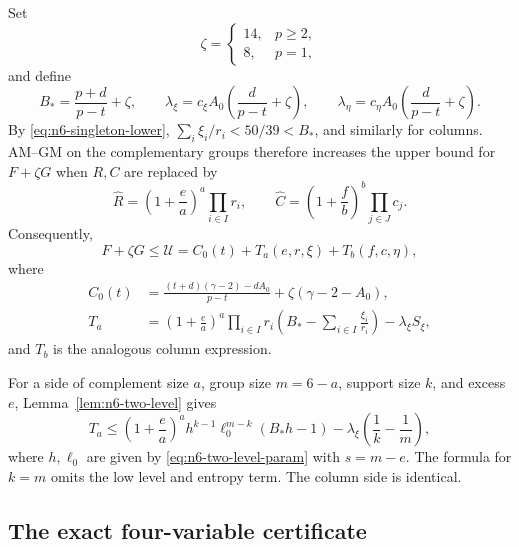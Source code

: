\documentclass[11pt,a4paper]{article}
\numberwithin{equation}{section}
\theoremstyle{definition}
\newcommand{\1}{\mathbf{1}}
\begin{document}
Set
\begin{equation}\label{eq:n6-zeta}
 \zeta=\begin{cases}14,&p\ge2,\\8,&p=1,\end{cases}
\end{equation}
and define
\begin{equation}\label{eq:n6-Bstar}
 B_*=\frac{p+d}{p-t}+\zeta,
 \qquad
 \lambda_\xi=c_\xi A_0\left(\frac d{p-t}+\zeta\right),
 \qquad
 \lambda_\eta=c_\eta A_0\left(\frac d{p-t}+\zeta\right).
\end{equation}
By \eqref{eq:n6-singleton-lower},
$\sum_i\xi_i/r_i<50/39<B_*$, and similarly for columns.  AM--GM on the
complementary groups therefore increases the upper bound for $F+\zeta G$
when $R,C$ are replaced by
\[
 \widehat R=\left(1+\frac ea\right)^a\prod_{i\in I}r_i,
 \qquad
 \widehat C=\left(1+\frac fb\right)^b\prod_{j\in J}c_j.
\]
Consequently,
\begin{equation}\label{eq:n6-dual-upper}
 F+\zeta G\le\mathcal U
 =C_0(t)+T_a(e,r,\xi)+T_b(f,c,\eta),
\end{equation}
where
\begin{align}
 C_0(t)&=
 \frac{(t+d)(\gamma-2)-dA_0}{p-t}
 +\zeta(\gamma-2-A_0),\label{eq:n6-C0}\\
 T_a&=
 \left(1+\frac ea\right)^a\prod_{i\in I}r_i
 \left(B_*-\sum_{i\in I}\frac{\xi_i}{r_i}\right)
 -\lambda_\xi S_\xi,\label{eq:n6-Ta}
\end{align}
and $T_b$ is the analogous column expression.

For a side of complement size $a$, group size $m=6-a$, support size $k$,
and excess $e$, Lemma~\ref{lem:n6-two-level} gives
\begin{equation}\label{eq:n6-Tcandidate}
 T_a\le
 \left(1+\frac ea\right)^a
 h^{k-1}\ell_0^{m-k}(B_*h-1)
 -\lambda_\xi\left(\frac1k-\frac1m\right),
\end{equation}
where $h,\ell_0$ are given by \eqref{eq:n6-two-level-param} with
$s=m-e$.  The formula for $k=m$ omits the low level and entropy term.  The
column side is identical.

\subsection{The exact four-variable certificate}
\end{document}

